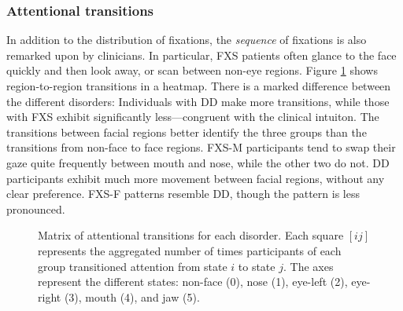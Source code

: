 \documentclass[10pt,twocolumn,letterpaper]{article}
\begin{document}
\subsubsection{Attentional transitions}

In addition to the distribution of fixations, the \emph{sequence} of fixations is also remarked upon by clinicians. In particular, FXS patients often glance to the face quickly and then look away, or scan between non-eye regions. Figure \ref{fig:transitions} shows region-to-region transitions in a heatmap. There is a marked difference between the different disorders: Individuals with DD make more transitions, while those with FXS exhibit significantly less---congruent with the clinical intuiton. The transitions between facial regions better identify the three groups than the transitions from non-face to face regions. FXS-M participants tend to swap their gaze quite frequently between mouth and nose, while the other two do not. DD participants exhibit much more movement between facial regions, without any clear preference. FXS-F patterns resemble DD, though the pattern is less pronounced.

\begin{figure}[b]
               \hfill   
               \hfill
\caption{Matrix of attentional transitions for each disorder. Each square $[ij]$ represents the aggregated number of times participants of each group transitioned attention from state $i$ to state $j$.  The axes represent the different states: non-face (0), nose (1), eye-left (2), eye-right (3), mouth (4), and jaw (5).}
\label{fig:transitions}
\end{figure}
\end{document}
